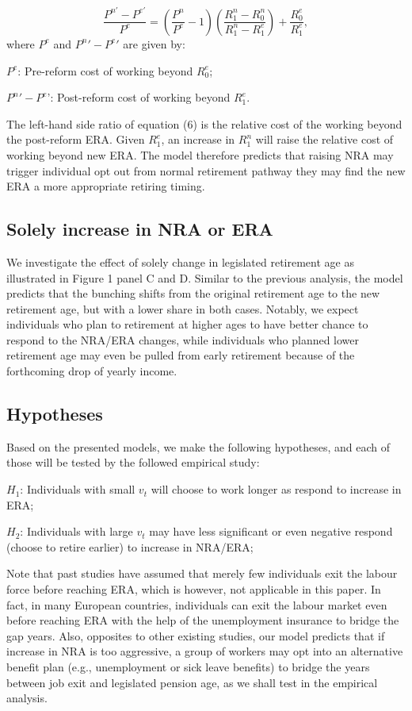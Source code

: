 \documentclass[a4paper]{article}
\begin{document}
\begin{equation}
    \frac{P^{n \prime}-P^{e \prime}}{P^{e}}=\left(\frac{P^{n}}{P^{e}}-1\right)\left(\frac{R_{1}^{n}-R_{0}^{n}}{R_{1}^{n}-R_{1}^{e}}\right)+\frac{R_{0}^{e}}{R_{1}^{e}},
\end{equation}
where $P^e$ and $P^n'-P^e'$ are given by:

$P^e$: Pre-reform cost of working beyond $R_0^e$;

$P^n'-P^e$': Post-reform cost of working beyond $R_1^e$. 

The left-hand side ratio of equation (6) is the relative cost of the working beyond the post-reform ERA. Given $R_1^e$, an increase in $R_1^n$ will raise the relative cost of working beyond new ERA. The model therefore predicts that raising NRA may trigger individual opt out from normal retirement pathway they may find the new ERA a more appropriate retiring timing.  

\subsection{Solely increase in NRA or ERA}

We investigate the effect of solely change in legislated retirement age as illustrated in Figure 1 panel C and D.  Similar to the previous analysis, the model predicts that the bunching shifts from the original retirement age to the new retirement age, but with a lower share in both cases. Notably, we expect individuals who plan to retirement at higher ages to have better chance to respond to the NRA/ERA changes, while individuals who planned lower retirement age may even be pulled from early retirement because of the forthcoming drop of yearly income. 

\subsection{Hypotheses}
Based on the presented models, we make the following hypotheses, and each of those will be tested by the followed empirical study:

$H_1$: Individuals with small $v_t$ will choose to work longer as respond to increase in ERA;

$H_2$: Individuals with large $v_t$ may have less significant or even negative respond (choose to retire earlier) to increase in NRA/ERA;

Note that past studies have assumed that merely few individuals exit the labour force before reaching ERA, which is however, not applicable in this paper. In fact, in many European countries, individuals can exit the labour market even before reaching ERA with the help of the unemployment insurance to bridge the gap years. Also, opposites to other existing studies, our model predicts that if increase in NRA is too aggressive, a group of workers may opt into an alternative benefit plan (e.g., unemployment or sick leave benefits) to bridge the years between job exit and legislated pension age, as we shall test in the empirical analysis. 
\end{document}
